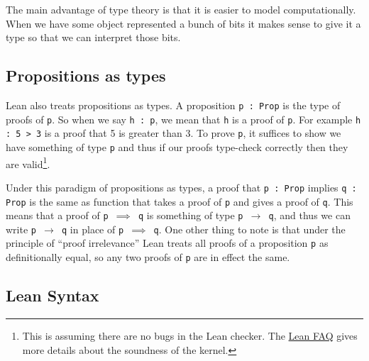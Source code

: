 \documentclass{article}
\renewcommand{\a}{\alpha}
\newcommand{\ct}{\texttt}
\begin{document}

The main advantage of type theory is that it is easier to model computationally.
When we have some object represented a bunch of bits it makes sense to give it a type so that we can interpret those bits.

\subsection{Propositions as types}
Lean also treats propositions as types. 
A proposition \ct{p : Prop} is the type of proofs of \ct{p}.
So when we say \ct{h : p}, we mean that \ct{h} is a proof of \ct{p}.
For example \ct{h : 5 > 3} is a proof that 5 is greater than 3.
To prove \ct{p}, it suffices to show we have something of type \ct{p} and thus if our proofs type-check correctly then they are valid\footnote{This is assuming there are no bugs in the Lean checker. The \href{https://github.com/leodemoura/lean/blob/master/doc/faq.md}{Lean FAQ} gives more details about the soundness of the kernel.}.

Under this paradigm of propositions as types, a proof that \ct{p : Prop} implies \ct{q : Prop} is the same as function that takes a proof of \ct{p} and gives a proof of \ct{q}.
This means that a proof of \ct{p $\implies$ q} is something of type \ct{p $\to$ q}, and thus we can write \ct{p $\to$ q} in place of \ct{p $\implies$ q}.
One other thing to note is that under the principle of ``proof irrelevance'' Lean treats all proofs of a proposition \ct{p} as definitionally equal, so any two proofs of \ct{p} are in effect the same.

\subsection{Lean Syntax} 
\end{document}
